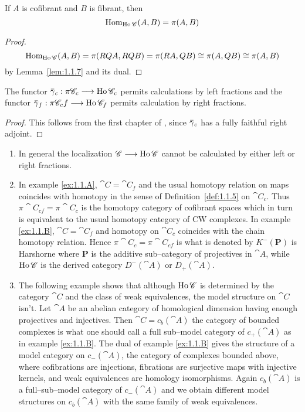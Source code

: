 \documentclass[../main]{subfiles}
\begin{document}
\begin{corollary}
If $A$ is cofibrant and $B$ is fibrant, then \[\operatorname{Hom}_{\operatorname{Ho} \mathscr{C}}(A, B) = \pi(A, B)\]
\end{corollary}

\begin{proof}
\[\operatorname{Hom}_{\operatorname{Ho} \mathscr{C}}(A, B) = \pi(RQA, RQB) = \pi(RA, QB) \cong \pi(A, QB) \cong \pi(A, B)\] by Lemma~\ref{lem:1.1.7} and its dual. 
\end{proof}

\begin{corollary}
The functor $\xoverline \gamma_c : \pi \cat C_c \longrightarrow \Ho \cat C_c$ permits calculations by left fractions and the functor $\xoverline \gamma_f : \pi \cat C_cf \longrightarrow \Ho \cat C_f$ permits calculation by right fractions. 
\end{corollary} 

\begin{proof}
This follows from the first chapter of \cite{gabriel_calculus_1967}, since $\xoverline \gamma_c$ has a fully faithful right adjoint. 
\end{proof} 

\begin{remarks*}
\begin{enumerate}
    \item In general the localization $\mathscr{C} \longrightarrow \operatorname{Ho} \mathscr{C}$ cannot be calculated by either left or right fractions.
    \item In example \ref{ex:1.1.A}, $\cat C = \cat C_f$ and the usual homotopy relation on maps coincides with homotopy in the sense of Definition~\ref{def:1.1.5} on $\cat C_c$. Thus $\pi \cat C_{cf} = \pi \cat C_c$ is the homotopy category of cofibrant spaces which in turn is equivalent to the usual homotopy category of CW complexes. In example \ref{ex:1.1.B}, $\cat C = \cat C_f$ and homotopy on $\cat C_c$ coincides with the chain homotopy relation. Hence $\pi \cat C_c = \pi \cat C_{cf}$ is what is denoted by $K^-(\mathbf P)$ is Harshorne \cite{hartshorne_residues_1966} where $\mathbf P$ is the additive sub--category of projectives in $\cat A$, while $\operatorname{Ho} \mathscr{C}$ is the derived category $D^-(\cat A)$ or $D_+(\cat A)$. 
    \item The following example shows that although $\operatorname{Ho} \mathscr{C}$ is determined by the category $\cat C$ and the class of weak equivalences, the model structure on $\cat C$ isn't. Let $\cat A$ be an abelian category of  homological dimension having enough projectives and injectives. Then $\cat C = c_b(\cat A)$ the category of bounded complexes is what one should call a full sub--model category of $c_+(\cat A)$ as in example \ref{ex:1.1.B}. The dual of example \ref{ex:1.1.B} gives the structure of a model category on $c_-(\cat A)$, the category of complexes bounded above, where cofibrations are injections, fibrations are surjective maps with injective kernels, and weak equivalences are homology isomorphisms. Again $c_b(\cat A)$ is a full--sub--model category of $c_-(\cat A)$ and we obtain different model structures on $c_b(\cat A)$ with the same family of weak equivalences.
\end{enumerate}
\end{remarks*}
\end{document}
